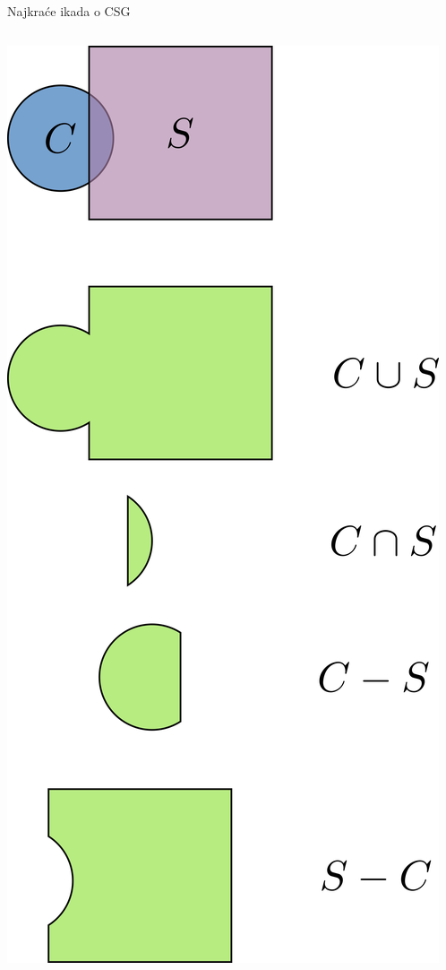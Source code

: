 \documentclass[9pt]{beamer}
\begin{document}
\begin{frame}{Najkraće ikada o CSG}
\begin{columns}
\begin{column}{0.5\textwidth}
\begin{center}
				\includegraphics[height=0.8\textheight]{slike/csg_01.png}
			\end{center}
		\end{column}
	\begin{column}{0.5\textwidth}

\end{column}
\end{columns}
\end{frame}
\end{document}
